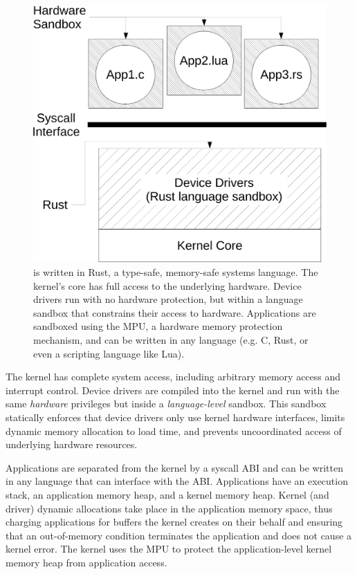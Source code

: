 \begin{figure}
 \centering
\includegraphics[width=1\columnwidth]{img/architecture-crop}
\caption{\name is written in Rust, a type-safe, memory-safe systems language.
The \name kernel's core has full access to the underlying hardware. Device
drivers run with no hardware protection, but within a language sandbox that
constrains their access to hardware. Applications are sandboxed using the MPU, a
hardware memory protection mechanism, and can be written in any language (e.g.
C, Rust, or even a scripting language like Lua).}
\label{fig:architecture}
\end{figure}


The \name kernel has complete system access, including arbitrary memory
access and interrupt control. Device drivers are compiled into the kernel and
run with the same \emph{hardware} privileges but inside a
\emph{language-level} sandbox. This sandbox statically enforces that device
drivers only use kernel hardware interfaces, limits dynamic memory
allocation to load time, and prevents uncoordinated access of underlying
hardware resources.

Applications are separated from the kernel by a syscall ABI and can be
written in any language that can interface with the ABI. 
Applications have an execution stack, an application memory
heap, and a kernel memory heap. Kernel (and driver) dynamic allocations take
place in the application memory space, thus charging applications for buffers
the kernel creates on their behalf and ensuring that an out-of-memory
condition terminates the application and does not cause a kernel error. 
The kernel uses the MPU to protect the application-level kernel memory heap
from application access.

